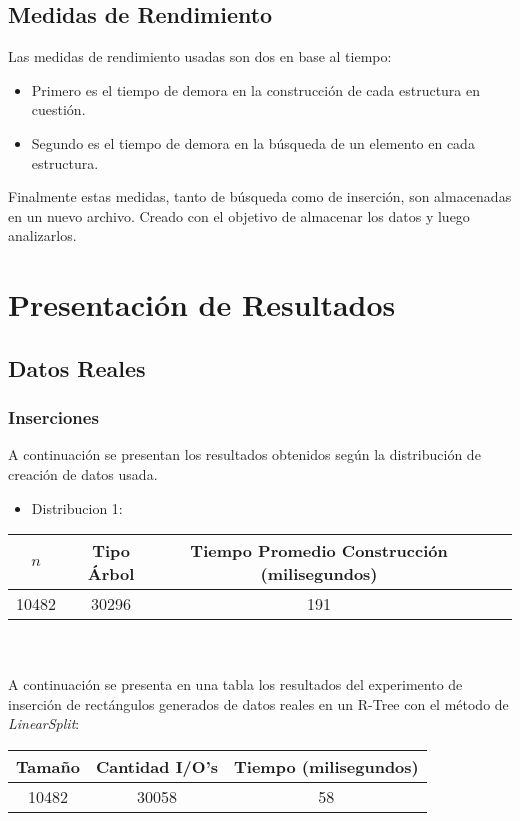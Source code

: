 \documentclass[letterpaper,12pt]{article}
\begin{document}
\subsection{Medidas de Rendimiento}
Las medidas de rendimiento usadas son dos en base al tiempo:
\begin{itemize}

\item Primero es el tiempo de demora en la construcción de cada estructura en cuestión.
	
\item Segundo es el tiempo de demora en la búsqueda de un elemento en cada estructura.

\end{itemize}

Finalmente estas medidas, tanto de búsqueda como de inserción, son almacenadas en un nuevo archivo. Creado con el objetivo de almacenar los datos y luego analizarlos.

\newpage
\section{Presentación de Resultados}

\subsection{Datos Reales}

\subsubsection{Inserciones}
A continuación se presentan los resultados obtenidos según la distribución de creación de datos usada.
\begin{itemize}

\item Distribucion 1:

\end{itemize}

\begin{tabular}{|c|c|c|c|c|}
\hline
\textbf{$n$} & \textbf{Tipo Árbol} & \textbf{Tiempo Promedio Construcción (milisegundos)} \\
\hline
10482 & 30296 & 191 \\
\hline
\end{tabular}
\\ \\

A continuación se presenta en una tabla los resultados del experimento de inserci\'on de rect\'angulos generados de datos reales en un R-Tree con el m\'etodo de \textit{LinearSplit}: \\
\begin{tabular}{|c|c|c|}
\hline
\textbf{Tama\~no} & \textbf{Cantidad I/O's} & \textbf{Tiempo (milisegundos)} \\
\hline
10482 & 30058 & 58 \\
\hline
\end{tabular}
\\ \\
\end{document}
